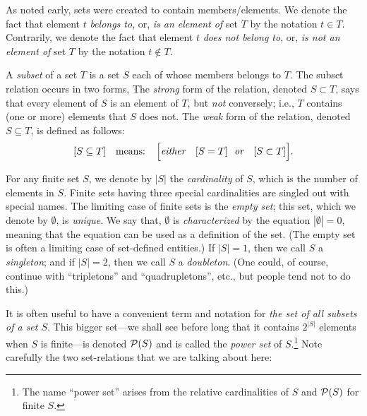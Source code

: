 \medskip

 
As noted early, sets were created to contain members/elements.  We denote the fact that element $t$ {\it belongs to}, or, {\it is an element of} set $T$ by the notation $t \in T$.  Contrarily,
we denote the fact that element $t$ {\it does not belong to}, or, {\it is not an element of} set $T$ by the notation $t \not\in T$. 

\smallskip

  
A {\em subset} of a set $T$ is a set $S$ each of whose members belongs to $T$.  The subset relation occurs in two forms, The {\em strong} form of the relation, denoted $S \subset T$, says that every element of $S$ is an element of $T$, but {\em not} conversely; i.e., $T$ contains (one or more) elements that $S$ does not.  The {\em weak} form of the relation, denoted $S \subseteq T$, is defined as follows:
\[
[S \subseteq T] \ \ \mbox{ means: } \ \
\Big[ \mbox{\em either } \ \ [S = T]
\ \ \mbox{\em or } \ \ [S \subset T] \Big].
\]

   
\index{set!empty set} \index{set!doubleton}
For any finite set $S$, we denote by $|S|$ the {\it cardinality} of $S$, which is the number of elements in $S$.  Finite sets having three special cardinalities are singled out with special names.  The limiting case of finite sets is the {\em empty set}; this set, which we denote by
$\emptyset$, is {\em unique}.  We say that, $\emptyset$ is {\it characterized} by the equation $|\emptyset| = 0$, meaning that the equation can be used as a definition of the set.  (The empty set is often a limiting case of set-defined entities.)  If $|S| = 1$, then we call $S$ a {\em singleton}; and if $|S| = 2$, then we call $S$ a {\em doubleton}.  (One could, of course, continue with ``tripletons'' and ``quadrupletons'', etc., but people tend not to do this.)

\smallskip

It is often useful to have a convenient term and notation for {\em the set of all subsets of a set $S$}.  This bigger set---we shall see before long that it contains $2^{|S|}$ elements when $S$ is finite---is denoted $\mbox{$\cal P$}(S)$ and is called the {\em power set} of $S$.\footnote{The name ``power set'' arises from the relative cardinalities of $S$ and ${\cal P}(S)$ for finite $S$.}  Note carefully the two set-relations that we are talking about here: 

